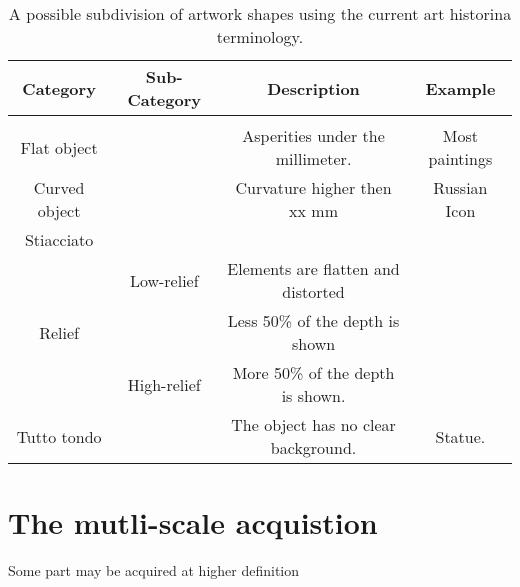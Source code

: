 \begin{table}[]
\centering
\label{tab:artworkshapes}
\begin{tabular}{cccc}
\textbf{Category}                & \textbf{Sub-Category} & \textbf{Description} & \textbf{Example}
\\
\hline
\\
Flat object             &              &   Asperities under the millimeter. & Most paintings           \\
Curved object           &              & Curvature higher then xx  mm & Russian Icon            \\
Stiacciato              &              &            & \\
\multirow{3}{*}{Relief} & Low-relief   & Elements are flatten and distorted       & \\
                        &              &    Less 50\% of the depth is shown          & \\
                        & High-relief  & More 50\% of the depth is shown.              & \\
Tutto tondo             &              &   The object has no clear background.         & Statue.
\end{tabular}
\caption{A possible subdivision of artwork shapes using the current art historina terminology.}
\end{table}
\section{The mutli-scale acquistion}
Some part may be acquired at higher definition


